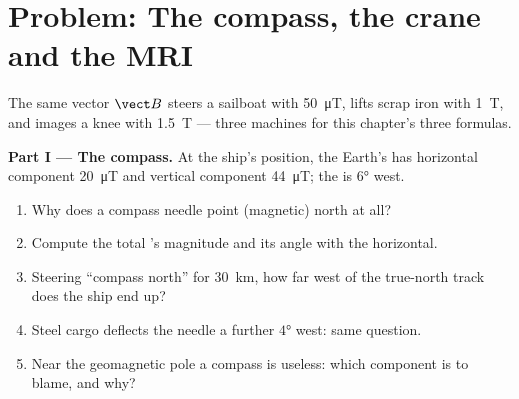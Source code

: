 \section{Problem: The compass, the crane and the MRI}

\begin{problem}
\label{pb:g11:magnetic-fields:1}
The same vector $\vect B$ steers a sailboat with \qty{50}{\micro T},
lifts scrap iron with \qty{1}{T}, and images a knee with \qty{1.5}{T}
--- three machines for this chapter's three formulas.

\medskip
\noindent\textbf{Part I --- The compass.}
At the ship's position, the Earth's  has horizontal component
\qty{20}{\micro T} and vertical component \qty{44}{\micro T};
the  is $\ang{6}$ west.
\begin{enumerate}
  \item Why does a compass needle point (magnetic) north at all?
  \item Compute the total 's magnitude and its angle with the horizontal.
  \item Steering ``compass north'' for \qty{30}{km}, how far west of
        the true-north track does the ship end up?
  \item Steel cargo deflects the needle a further $\ang{4}$ west: same question.
  \item Near the geomagnetic pole a compass is useless: which component
        is to blame, and why?
\end{enumerate}


\end{problem}
